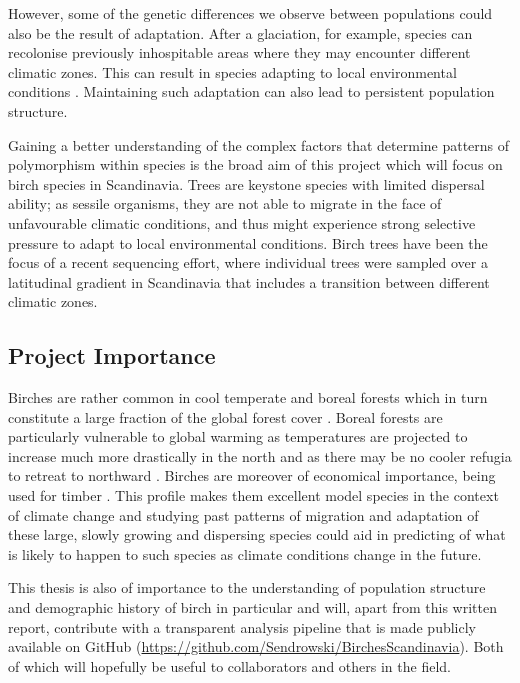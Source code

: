 \documentclass[hidelinks,11pt]{article}
\begin{document}
    However, some of the genetic differences we observe between populations could also be the result of adaptation. After a glaciation, for example, species can recolonise previously inhospitable areas where they may encounter different climatic zones. This can result in species adapting to local environmental conditions \cite{jarkko}. Maintaining such adaptation can also lead to persistent population structure.

    Gaining a better understanding of the complex factors that determine patterns of polymorphism within species is the broad aim of this project which will focus on birch species in Scandinavia. Trees are keystone species with limited dispersal ability; as sessile organisms, they are not able to migrate in the face of unfavourable climatic conditions, and thus might experience strong selective pressure to adapt to local environmental conditions. Birch trees have been the focus of a recent sequencing effort, where individual trees were sampled over a latitudinal gradient in Scandinavia that includes a transition between different climatic zones.

    \subsection{Project Importance}
    \label{sec:project-importance}

    Birches are rather common in cool temperate and boreal forests which in turn constitute a large fraction of the global forest cover \cite{multispecies-structure-birch}. Boreal forests are particularly vulnerable to global warming as temperatures are projected to increase much more drastically in the north and as there may be no cooler refugia to retreat to northward \cite{jarkko}. Birches are moreover of economical importance, being used for timber \cite{multispecies-structure-birch}. This profile makes them excellent model species in the context of climate change and studying past patterns of migration and adaptation of these large, slowly growing and dispersing species could aid in predicting of what is likely to happen to such species as climate conditions change in the future.

    This thesis is also of importance to the understanding of population structure and demographic history of birch in particular and will, apart from this written report, contribute with a transparent analysis pipeline that is made publicly available on GitHub (\url{https://github.com/Sendrowski/BirchesScandinavia}). Both of which will hopefully be useful to collaborators and others in the field.
\end{document}
